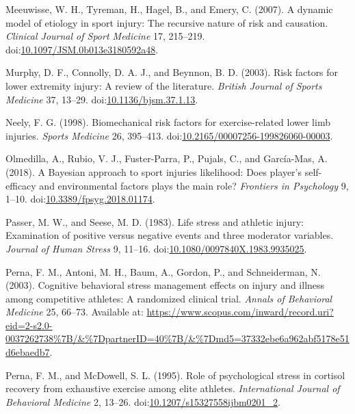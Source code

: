 \documentclass[utf8]{frontiersHLTH}
\begin{document}
\leavevmode\hypertarget{ref-Meeuwisse2007}{}%
Meeuwisse, W. H., Tyreman, H., Hagel, B., and Emery, C. (2007). A
dynamic model of etiology in sport injury: The recursive nature of risk
and causation. \emph{Clinical Journal of Sport Medicine} 17, 215--219.
doi:\href{https://doi.org/10.1097/JSM.0b013e3180592a48}{10.1097/JSM.0b013e3180592a48}.

\leavevmode\hypertarget{ref-Murphy2003}{}%
Murphy, D. F., Connolly, D. A. J., and Beynnon, B. D. (2003). Risk
factors for lower extremity injury: A review of the literature.
\emph{British Journal of Sports Medicine} 37, 13--29.
doi:\href{https://doi.org/10.1136/bjsm.37.1.13}{10.1136/bjsm.37.1.13}.

\leavevmode\hypertarget{ref-Neely1998}{}%
Neely, F. G. (1998). Biomechanical risk factors for exercise-related
lower limb injuries. \emph{Sports Medicine} 26, 395--413.
doi:\href{https://doi.org/10.2165/00007256-199826060-00003}{10.2165/00007256-199826060-00003}.

\leavevmode\hypertarget{ref-Olmedilla2018}{}%
Olmedilla, A., Rubio, V. J., Fuster-Parra, P., Pujals, C., and
García-Mas, A. (2018). A Bayesian approach to sport injuries likelihood:
Does player's self-efficacy and environmental factors plays the main
role? \emph{Frontiers in Psychology} 9, 1--10.
doi:\href{https://doi.org/10.3389/fpsyg.2018.01174}{10.3389/fpsyg.2018.01174}.

\leavevmode\hypertarget{ref-Passer1983a}{}%
Passer, M. W., and Seese, M. D. (1983). Life stress and athletic injury:
Examination of positive versus negative events and three moderator
variables. \emph{Journal of Human Stress} 9, 11--16.
doi:\href{https://doi.org/10.1080/0097840X.1983.9935025}{10.1080/0097840X.1983.9935025}.

\leavevmode\hypertarget{ref-Perna2003}{}%
Perna, F. M., Antoni, M. H., Baum, A., Gordon, P., and Schneiderman, N.
(2003). Cognitive behavioral stress management effects on injury and
illness among competitive athletes: A randomized clinical trial.
\emph{Annals of Behavioral Medicine} 25, 66--73. Available at:
\url{https://www.scopus.com/inward/record.uri?eid=2-s2.0-0037262738\%7B/\&\%7DpartnerID=40\%7B/\&\%7Dmd5=37332ebe6a962abf5178e51d6ebaedb7}.

\leavevmode\hypertarget{ref-Perna1995}{}%
Perna, F. M., and McDowell, S. L. (1995). Role of psychological stress
in cortisol recovery from exhaustive exercise among elite athletes.
\emph{International Journal of Behavioral Medicine} 2, 13--26.
doi:\href{https://doi.org/10.1207/s15327558ijbm0201_2}{10.1207/s15327558ijbm0201\_2}.
\end{document}
